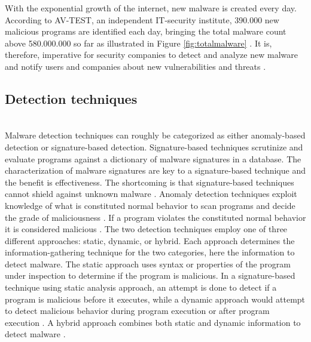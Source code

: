\documentclass[12pt]{article} %
\begin{document}
With the exponential growth of the internet, new malware is created every day. According to AV-TEST, an independent IT-security institute, 390.000 new malicious programs are identified each day, bringing the total malware count above 580.000.000 so far as illustrated in Figure \ref{fig:totalmalware} \cite{avtest}. It is, therefore, imperative for security companies to detect and analyze new malware and notify users and companies about new vulnerabilities and threats \cite{kosmidis2017machine}.  
\\
\subsection{Detection techniques}
\\ 
Malware detection techniques can roughly be categorized as either anomaly-based detection or signature-based detection. Signature-based techniques scrutinize and evaluate programs against a dictionary of malware signatures in a database. The characterization of malware signatures are key to a signature-based technique and the benefit is effectiveness. The shortcoming is that signature-based techniques cannot shield against unknown malware \cite{Asurveyonmalware, idika2007survey}. Anomaly detection techniques exploit knowledge of what is constituted normal behavior to scan programs and decide the grade of maliciousness \cite{idika2007survey}. If a program violates the constituted normal behavior it is considered malicious \cite{idika2007survey}. 
The two detection techniques employ one of three different approaches: static,  dynamic, or hybrid. Each approach determines the information-gathering technique for the two categories, here the information to detect malware. The static approach uses syntax or properties of the program under inspection to determine if the program is malicious. In a signature-based technique using static analysis approach, an attempt is done to detect if a program is malicious before it executes, while a dynamic approach would attempt to detect malicious behavior during program execution or after program execution \cite{idika2007survey}. A hybrid approach combines both static and dynamic information to detect malware \cite{idika2007survey}.
\\
\end{document}
